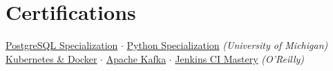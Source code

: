 \section{Certifications}
\noindent
\href{https://www.coursera.org/account/accomplishments/specialization/certificate/CHA8DBWBGJ2K}{PostgreSQL Specialization} \quad$\cdot$\quad
\href{https://www.coursera.org/account/accomplishments/specialization/certificate/U87UNMWZD8H5}{Python Specialization} \hfill \textit{(University of Michigan)} \\

\href{https://www.credly.com/badges/1ad9c31b-d78e-43a3-a4e3-5d22417fdbae/public_url}{Kubernetes \& Docker} \quad$\cdot$\quad
\href{https://www.credly.com/badges/958596c2-4662-409c-a277-3ef6852411f3/public_url}{Apache Kafka} \quad$\cdot$\quad
\href{https://www.credly.com/badges/87c61572-8d48-478a-96d3-7c771e21b9f4/public_url}{Jenkins CI Mastery} \hfill \textit{(O'Reilly)}